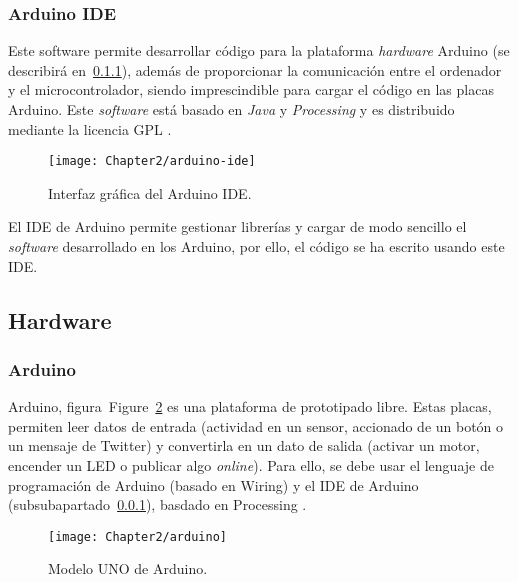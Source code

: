 \subsubsection{Arduino IDE}
\label{subs:arduino_ide}

Este software permite desarrollar código para la plataforma \textit{hardware}
Arduino (se describirá en~\ref{subs:arduino}), además de proporcionar la
comunicación entre el ordenador y el microcontrolador, siendo imprescindible
para cargar el código en las placas Arduino. Este \textit{software} está basado
en \textit{Java} y \textit{Processing} y es distribuido mediante la licencia
GPL \cite{arduino-software}.

\begin{figure}[htp]
  \centering
    \texttt{[image: Chapter2/arduino-ide]}
  \caption{Interfaz gráfica del Arduino IDE.}
\label{fig:arduino-ide}
\end{figure}

El IDE de Arduino permite gestionar librerías y cargar de modo sencillo el
\textit{software} desarrollado en los Arduino, por ello, el código se ha escrito
usando este IDE.






\subsection{Hardware}
\label{sub:hardware}

\subsubsection{Arduino}
\label{subs:arduino}

Arduino, figura~Figure~\ref{fig:arduino}  es una plataforma de prototipado libre. Estas placas, permiten leer
datos de entrada (actividad en un sensor, accionado de un botón o un mensaje
de Twitter) y convertirla en un dato de salida (activar un motor, encender
un LED o publicar algo \textit{online}). Para ello, se debe usar el lenguaje
de programación de Arduino (basado en Wiring) y el IDE de Arduino
(subsubapartado~\ref{subs:arduino_ide}), basdado en Processing \cite{arduino-software}.

\begin{figure}[htp]
  \centering
    \texttt{[image: Chapter2/arduino]}
  \caption{Modelo UNO de Arduino.}
\label{fig:arduino}
\end{figure}

